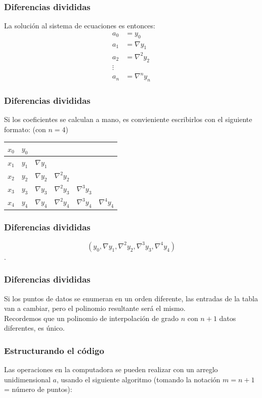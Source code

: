 \begin{frame}
\frametitle{Diferencias divididas}
La solución al sistema de ecuaciones es entonces:
\begin{align*}
a_{0} &= y_{0} \\
a_{1} &= \nabla y_{1} \\
a_{2} &= \nabla^{2} y_{2} \\
\vdots \\
a_{n} &= \nabla^{n} y_{n}
\end{align*}
\end{frame}
\begin{frame}
\frametitle{Diferencias divididas}
Si los coeficientes se calculan a mano, es convieniente escribirlos con el siguiente formato:
(con $n=4$)
\\
\medskip
\begin{center}
\begin{tabular}{| c | c | c | c | c | c |}
\hline $x_{0}$ & $y_{0}$ & & & & \\
\hline $x_{1}$ & $y_{1}$ & $\nabla y_{1}$ & & & \\
\hline $x_{2}$ & $y_{2}$ & $\nabla y_{2}$ & $\nabla^{2} y_{2}$ & &  \\
\hline $x_{3}$ & $y_{3}$ & $\nabla y_{3}$ & $\nabla^{2} y_{3}$ & $\nabla^{3} y_{3}$ &  \\
\hline $x_{4}$ & $y_{4}$ & $\nabla y_{4}$ & $\nabla^{2} y_{4}$ & $\nabla^{3} y_{4}$ & $\nabla^{4} y_{4}$ \\
\hline
\end{tabular}
\end{center}
\end{frame}
\begin{frame}
\frametitle{Diferencias divididas}
\[ (y_{0}, \nabla y_{1}, \nabla^{2} y_{2}, \nabla^{3} y_{3}, \nabla^{4} y_{4}) \]
\pause
{}.
\end{frame}
\begin{frame}
\frametitle{Diferencias divididas}
Si los puntos de datos se enumeran en un orden diferente, las entradas de la tabla van a cambiar, pero el polinomio resultante será el mismo.
\\
\bigskip
Recordemos que un polinomio de interpolación de grado $n$ con $n + 1$ datos diferentes, es único.
\end{frame}
\begin{frame}[fragile]
\frametitle{Estructurando el código}
Las operaciones en la computadora se pueden realizar con un arreglo unidimensional $a$, usando el siguiente algoritmo (tomando la notación $m = n + 1$ = número de puntos):
\end{frame}
